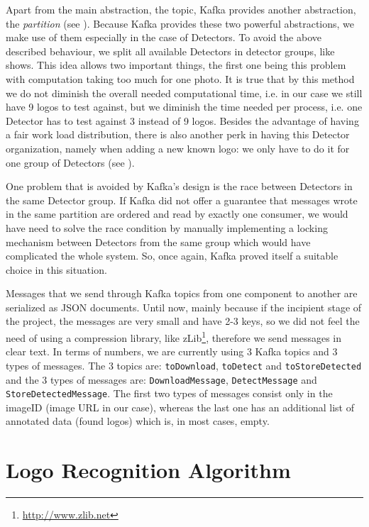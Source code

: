 Apart from the main abstraction, the topic, Kafka provides another abstraction, the
\textit{partition} (see ). Because Kafka
provides these two powerful abstractions, we make use of them especially in
the case of Detectors. To avoid the above described behaviour, we split all
available Detectors in detector groups, like
 shows. This idea allows two
important things, the first one being this problem with computation taking too
much for one photo. It is true that by this method we do not diminish the
overall needed computational time, i.e. in our case we still have 9 logos to
test against, but we diminish the time needed per process, i.e. one Detector
has to test against 3 instead of 9 logos. Besides the advantage of having a
fair work load distribution, there is also another perk in having this
Detector organization, namely when adding a new known logo: we only have to do
it for one group of Detectors (see ).

One problem that is avoided by Kafka's design is the race between Detectors in
the same Detector group. If Kafka did not offer a guarantee that messages
wrote in the same partition are ordered and read by exactly one consumer, we
would have need to solve the race condition by manually implementing a locking
mechanism between Detectors from the same group which would have complicated
the whole system. So, once again, Kafka proved itself a suitable choice in
this situation.

Messages that we send through Kafka topics from one component to another are
serialized as JSON documents. Until now, mainly because if the incipient stage
of the project, the messages are very small and have 2-3 keys, so we did not
feel the need of using a compression library, like
zLib\footnote{\url{http://www.zlib.net}}, therefore we send messages in clear
text. In terms of numbers, we are currently using 3 Kafka topics and 3 types
of messages. The 3 topics are: \texttt{toDownload}, \texttt{toDetect} and
\texttt{toStoreDetected} and the 3 types of messages are:
\texttt{DownloadMessage}, \texttt{DetectMessage} and
\texttt{StoreDetectedMessage}. The first two types of messages consist only in
the imageID (image URL in our case), whereas the last one has an additional
list of annotated data (found logos) which is, in most cases, empty.

\section{Logo Recognition Algorithm}
\label{sec:logo-alg}

